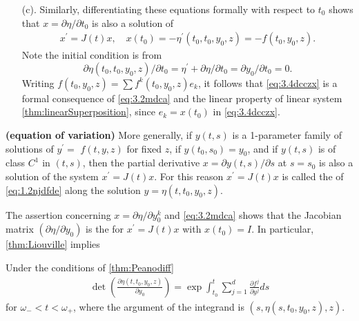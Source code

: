 \documentclass{article}
\newcommand{\bfs}[1]{\textbf{({#1}) }}
\begin{document}
\begin{enumerate}
\item [(c).]
Similarly, differentiating these equations formally with respect to $t_{0}$ shows that $x=\partial \eta / \partial t_{0}$ is also a solution of \begin{align}
    x^{\prime}=J(t) x, \quad x\left(t_{0}\right)=-\eta^{\prime}\left(t_{0}, t_{0}, y_{0}, z\right)=-f\left(t_{0}, y_{0}, z\right).\label{eq:gffda}
\end{align}
Note the initial condition is from $$\partial\eta\left(t_{0}, t_{0}, y_{0}, z\right)/\partial t_0= \eta^{\prime} + \partial\eta/\partial t_0 =  \partial y_{0}/\partial t_0=0.$$ 
Writing $f\left(t_{0}, y_{0}, z\right)=\sum f^{k}\left(t_{0}, y_{0}, z\right) e_{k}$, it follows that \cref{eq:3.4dcczx} is a formal consequence of \cref{eq:3.2mdca}  and the linear property of linear system \cref{thm:linearSuperposition}, since $e_k=x(t_0)$ in \cref{eq:3.4dcczx}. %

\end{enumerate}

\begin{rema}\bfs{equation of variation}
More generally, if $y(t, s)$ is a 1-parameter family of solutions of $y^{\prime}=$ $f(t, y, z)$ for fixed $z$, if $y\left(t_{0}, s_{0}\right)=y_{0}$, and if $y(t, s)$ is of class $C^{1}$ in $(t, s)$, then the partial derivative $x=\partial y(t, s) / \partial s$ at $s=s_{0}$ is also a solution of the system $x^{\prime}=J(t) x$. For this reason $x^{\prime}=J(t) x$ is called the  of \cref{eq:1.2njdfde} along the solution $y=\eta\left(t, t_{0}, y_{0}, z\right)$.
\end{rema}


The assertion concerning $x=\partial \eta / \partial y_{0}^{k}$ and \cref{eq:3.2mdca} shows that the Jacobian matrix $\left(\partial \eta / \partial y_{0}\right)$ is the  for $x^{\prime}=J(t) x$ with  $x(t_{0})=I$. In particular, \cref{thm:Liouville} implies
\begin{cora}
Under the conditions of \cref{thm:Peanodiff}
\begin{align}
\operatorname{det}\left(\frac{\partial \eta\left(t, t_{0}, y_{0}, z\right)}{\partial y_{0}}\right)=\exp \int_{t_{0}}^{t} \sum_{j=1}^{d} \frac{\partial f^{j}}{\partial y^{j}} d s\label{eq:ijcad}
\end{align}
for $\omega_{-}<t<\omega_{+}$, where the argument of the integrand is $\left(s, \eta\left(s, t_{0}, y_{0}, z\right), z\right)$.
\end{cora}
\end{document}
